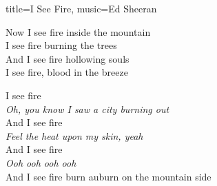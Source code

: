 \begin{song}{title={I See Fire}, music={Ed Sheeran}}
\begin{multicols}{2}
\begin{interlude}
    \end{interlude}
    \begin{chorus}
        Now I see fire inside the mountain \\
        I see fire burning the trees \\
        And I see fire hollowing souls \\
        I see fire, blood in the breeze
    \end{chorus}
    \begin{chorus*}
        I see fire \\
        \textit{Oh, you know I saw a city burning out} \smallskip \\
        And I see fire \\
        \textit{Feel the heat upon my skin, yeah} \smallskip \\
        And I see fire \\
        \textit{Ooh ooh ooh ooh} \smallskip \\
        And I see fire burn auburn on the mountain side
    \end{chorus*}
    \end{multicols}
\end{song}

